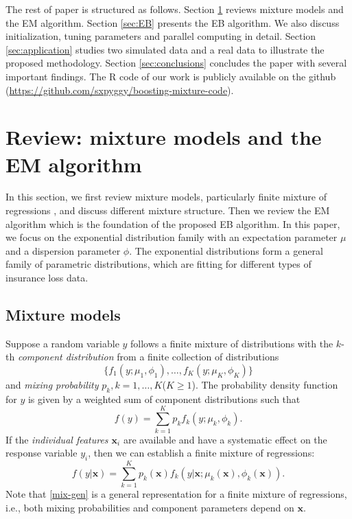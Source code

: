 \documentclass[11pt]{article}
\numberwithin{equation}{section}
\def\bx{\boldsymbol{x}}
\begin{document}

The rest of paper is structured as follows. 
Section \ref{sec:review} reviews mixture models and the EM algorithm. 
Section \ref{sec:EB} presents the EB algorithm. We also discuss initialization, tuning parameters and parallel computing in detail.   
Section \ref{sec:application} studies two simulated data and a real data to illustrate the proposed methodology. Section \ref{sec:conclusions} concludes the paper with several important findings.  The R code of our work is publicly available on the github (\url{https://github.com/sxpyggy/boosting-mixture-code}).


\section{Review: mixture models and the EM algorithm}\label{sec:review}

In this section, we first review mixture models, particularly finite mixture of regressions \citep{peel2000finite}, and discuss different mixture structure. 
Then we review the EM algorithm which is the foundation of the proposed EB algorithm. 
In this paper, we focus on the exponential distribution family with an expectation parameter $\mu$ and a dispersion parameter $\phi$. 
The exponential distributions form a general family of parametric distributions, which are fitting for different types of insurance loss data.

\subsection{Mixture models}\label{review:mix1}
Suppose a random variable $y$ follows a finite mixture of distributions with the $k$-th {\it component distribution} from a finite collection of distributions
	$$\{f_1(y;\mu_1,\phi_1),\ldots,f_K(y;\mu_K,\phi_K)\}$$
	and \textit{mixing probability} $p_k, k=1,\ldots,K$($K \geqslant 1$).
	The probability density function for $y$ is given by a weighted sum of component distributions such that
	$$f(y)=\sum_{k=1}^Kp_kf_k(y;\mu_k,\phi_k).$$
	If the {\it individual features $\bx_i$} are available and have a systematic effect on the response variable $y_i$, then we can establish a finite mixture of regressions:
	\begin{equation}\label{mix-gen}
		f(y|\bx)=\sum_{k=1}^Kp_k(\bx)f_k(y|\bx;\mu_k(\bx),\phi_k(\bx)).
	\end{equation}
	Note that \eqref{mix-gen} is a general representation for a finite mixture of regressions, 
	i.e., both mixing probabilities and component parameters depend on $\bx$.
	 
\end{document}
